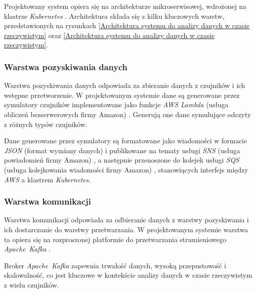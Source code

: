 Projektowany system opiera się na architekturze mikroserwisowej, wdrożonej na klastrze \textit{Kubernetes} \cite{kubernetes_benefits}.
Architektura składa się z kilku kluczowych warstw, przedstawionych na rysunkach \ref{Architektura systemu do analizy danych w czasie rzeczywistym} oraz \ref{Architektura systemu do analizy danych w czasie rzeczywistym}.



\newpage

\subsubsection{Warstwa pozyskiwania danych}
\label{subsubsec:warstwa_pozyskiwania}

Warstwa pozyskiwania danych odpowiada za zbieranie danych z czujników i ich wstępne przetworzenie.
W projektowanym systemie dane są generowane przez symulatory czujników implementowane jako funkcje \textit{AWS Lambda} (usługa obliczeń bezserwerowych firmy Amazon) \cite{aws_lambda_docs}.
Generują one dane symulujące odczyty z różnych typów czujników.

Dane generowane przez symulatory są formatowane jako wiadomości w formacie \textit{JSON} (format wymiany danych) \cite{json_schema_org} i publikowane na tematy usługi \textit{SNS} (usługa powiadomień firmy Amazon) \cite{sns_docs}, a następnie przenoszone do kolejek usługi \textit{SQS} (usługa kolejkowania wiadomości firmy Amazon) \cite{sqs_docs}, stanowiących interfejs między \textit{AWS} a klastrem \textit{Kubernetes}.

\subsubsection{Warstwa komunikacji}
\label{subsubsec:warstwa_komunikacji}

Warstwa komunikacji odpowiada za odbieranie danych z warstwy pozyskiwania i ich dostarczanie do warstwy przetwarzania.
W projektowanym systemie warstwa ta opiera się na rozproszonej platformie do przetwarzania strumieniowego \mbox{\textit{Apache Kafka}} \cite{kafka}.


Broker \mbox{\textit{Apache Kafka}} zapewnia trwałość danych, wysoką przepustowość i skalowalność, co jest kluczowe w kontekście analizy danych w czasie rzeczywistym z wielu czujników.


